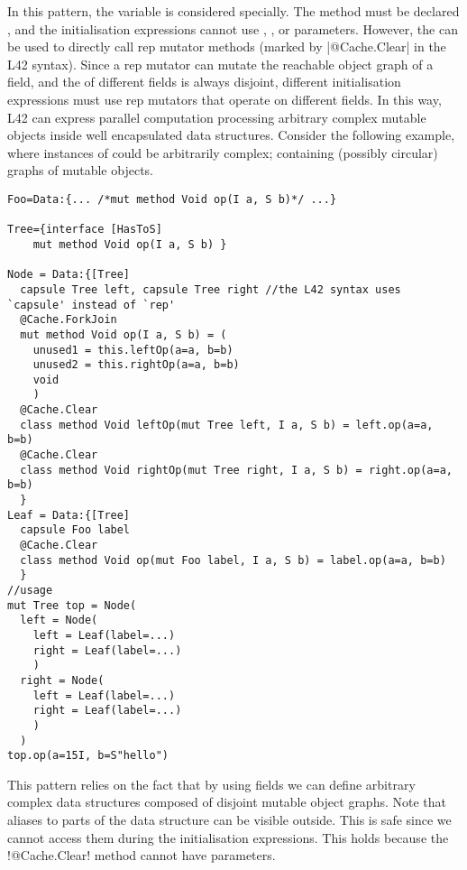 In this pattern, the \Q@this@ variable is considered specially.
The method must be declared \Q@mut@, and the 
initialisation expressions cannot
use \Q@mut@, \Q@lent@, or \Q@read@ parameters.
However, the \Q@mut@ \Q@this@ can be used to directly call
rep mutator methods (marked by \Q|@Cache.Clear| in the L42 syntax).
Since a rep mutator can mutate the reachable object graph of a \Q@rep@ field, and the \mrog of different \Q@rep@ fields is always disjoint, 
different initialisation expressions must use rep mutators that operate on different \Q@rep@ fields.
In this way, L42 can express parallel computation processing arbitrary complex mutable objects inside well encapsulated data structures.
Consider the following example, where instances of \Q@Foo@ could be arbitrarily complex; containing (possibly circular) graphs of mutable objects.
\begin{lstlisting}[deletekeywords=label]
Foo=Data:{... /*mut method Void op(I a, S b)*/ ...}

Tree={interface [HasToS]
	mut method Void op(I a, S b) }

Node = Data:{[Tree] 
  capsule Tree left, capsule Tree right //the L42 syntax uses `capsule' instead of `rep'
  @Cache.ForkJoin
  mut method Void op(I a, S b) = (
    unused1 = this.leftOp(a=a, b=b)
    unused2 = this.rightOp(a=a, b=b)
    void
    )
  @Cache.Clear
  class method Void leftOp(mut Tree left, I a, S b) = left.op(a=a, b=b)
  @Cache.Clear
  class method Void rightOp(mut Tree right, I a, S b) = right.op(a=a, b=b)
  }
Leaf = Data:{[Tree]
  capsule Foo label
  @Cache.Clear
  class method Void op(mut Foo label, I a, S b) = label.op(a=a, b=b)
  }
//usage
mut Tree top = Node(
  left = Node(
    left = Leaf(label=...)
    right = Leaf(label=...)
    )
  right = Node(
    left = Leaf(label=...)
    right = Leaf(label=...)
    )
  )
top.op(a=15I, b=S"hello")
\end{lstlisting}

This pattern relies on the fact that by using \Q@rep@ fields we can define arbitrary complex data structures composed of disjoint mutable object graphs.
Note that \Q@read@ aliases to parts of the data structure can be visible outside.
This is safe since we cannot access them during the initialisation expressions. This holds because the \Q!@Cache.Clear! method cannot have \Q@read@ parameters. %

